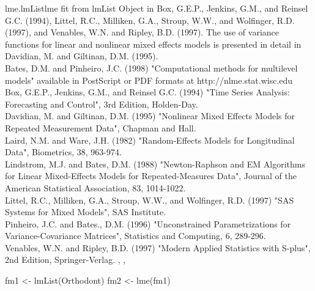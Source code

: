 \documentclass[pdftex]{article} \usepackage{url,graphicx}
\begin{document}
\begin{Helpfile}{lme.lmList}{{\sc lme} fit from lmList Object}
in Box, G.E.P., Jenkins, G.M., and Reinsel G.C. (1994), Littel, R.C.,
Milliken, G.A., Stroup, W.W., and Wolfinger, R.D. (1997), and Venables,
W.N. and Ripley, B.D. (1997). The use of variance functions for linear
and nonlinear mixed effects models is presented in detail in Davidian,
M. and Giltinan, D.M. (1995). \\
Bates, D.M. and Pinheiro, J.C. (1998) "Computational methods for
multilevel models" available in PostScript or PDF formats at
http://nlme.stat.wisc.edu\\
Box, G.E.P., Jenkins, G.M., and Reinsel G.C. (1994) "Time Series
Analysis: Forecasting and Control", 3rd Edition, Holden-Day. \\
Davidian, M. and Giltinan, D.M. (1995) "Nonlinear Mixed Effects Models
for Repeated Measurement Data", Chapman and Hall.\\
Laird, N.M. and Ware, J.H. (1982) "Random-Effects Models for
Longitudinal Data", Biometrics, 38, 963-974.  \\
Lindstrom, M.J. and Bates, D.M. (1988) "Newton-Raphson and EM
Algorithms for Linear Mixed-Effects Models for Repeated-Measures
Data", Journal of the American Statistical Association, 83,
1014-1022. \\
Littel, R.C., Milliken, G.A., Stroup, W.W., and Wolfinger, R.D. (1997)
"SAS Systems for Mixed Models", SAS Institute.\\
Pinheiro, J.C. and Bates., D.M.  (1996) "Unconstrained
Parametrizations for Variance-Covariance Matrices", Statistics and
Computing, 6, 289-296.\\
Venables, W.N. and Ripley, B.D. (1997) "Modern Applied Statistics with
S-plus", 2nd Edition, Springer-Verlag.
, ,
\need 15pt
\vspace{-16pt}
\begin{Example}
fm1 <- lmList(Orthodont)
fm2 <- lme(fm1)
\end{Example}
\end{Helpfile}
\end{document}
